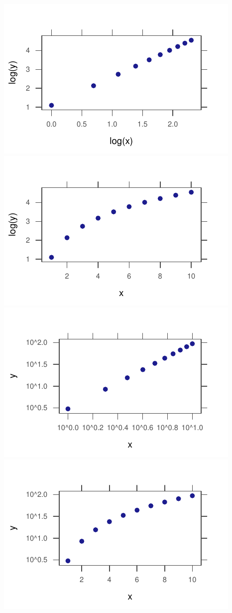 \documentclass[twoside]{book}\usepackage[]{graphicx}\usepackage[]{xcolor}
\makeatletter
\def\maxwidth{ %
  \ifdim\Gin@nat@width>\linewidth
    \linewidth
  \else
    \Gin@nat@width
  \fi
}
\newenvironment{knitrout}{}{} %
\makeatother
\begin{document}
\begin{knitrout}
{\centering \includegraphics[width=\maxwidth]{figures/fig-unnamed-chunk-220-1} 
\includegraphics[width=\maxwidth]{figures/fig-unnamed-chunk-220-2} 
\includegraphics[width=\maxwidth]{figures/fig-unnamed-chunk-220-3} 
\includegraphics[width=\maxwidth]{figures/fig-unnamed-chunk-220-4} 

}
\end{knitrout}
\end{document}
